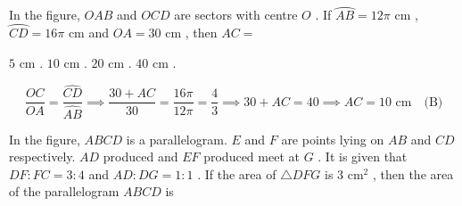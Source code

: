 
\question In the figure, $OAB$ and $OCD$ are sectors with centre $O$ . If $\wideparen{AB} = 12\pi\text{ cm}$ , $\wideparen{CD} = 16\pi\text{ cm}$ and $OA = 30\text{ cm}$ , then $AC =$

\begin{minipage}{0.45\textwidth}
\begin{choices}
    \choice $5\text{ cm}$ .
    \correctchoice $10\text{ cm}$ .
    \choice $20\text{ cm}$ .
    \choice $40\text{ cm}$ .
\end{choices}
\end{minipage}
\begin{minipage}{0.52\textwidth}
\centering
{}
\end{minipage}
\begin{solution}
\[ \frac{OC}{OA} = \frac{\widehat{CD}}{\widehat{AB}} \implies \frac{30 + AC}{30} = \frac{16\pi}{12\pi} = \frac{4}{3} \implies 30 + AC = 40 \implies AC = 10\text{ cm} \quad \text{(B)} \]
\end{solution}

\question In the figure, $ABCD$ is a parallelogram. $E$ and $F$ are points lying on $AB$ and $CD$ respectively. $AD$ produced and $EF$ produced meet at $G$ . It is given that $DF : FC = 3 : 4$ and $AD : DG = 1 : 1$ . If the area of $\triangle DFG$ is $3\text{ cm}^2$ , then the area of the parallelogram $ABCD$ is

